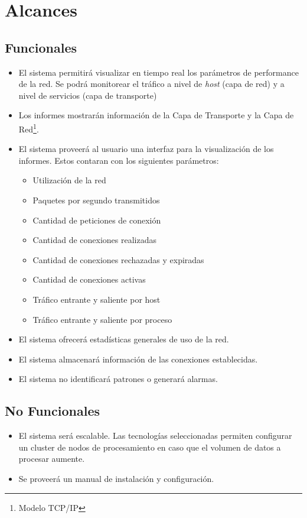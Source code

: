 \section*{Alcances}

\subsection*{Funcionales}
\begin{itemize}
	\item El sistema permitirá visualizar en tiempo real los parámetros de performance de la red. Se podrá monitorear el tráfico a nivel de \textit{host} (capa de red) y a nivel de servicios (capa de transporte)
	\item Los informes mostrarán información de la Capa de Transporte y la Capa de Red\footnote{Modelo TCP/IP}. \cite{rfc791}\cite{rfc793}\cite{rfc1180}
	\item El sistema proveerá al usuario una interfaz para la visualización de los informes. Estos contaran con los siguientes parámetros:
	\begin{itemize}
		\item Utilización de la red
		\item Paquetes por segundo transmitidos
		\item Cantidad de peticiones de conexión
		\item Cantidad de conexiones realizadas
		\item Cantidad de conexiones rechazadas y expiradas
		\item Cantidad de conexiones activas
		\item Tráfico entrante y saliente por host
		\item Tráfico entrante y saliente por proceso
	\end{itemize}
	\item El sistema ofrecerá estadísticas generales de uso de la red.
	\item El sistema almacenará información de las conexiones establecidas.
	\item El sistema no identificará patrones o generará alarmas.
\end{itemize}

\subsection*{No Funcionales}
\begin{itemize}
	\item El sistema será escalable. Las tecnologías seleccionadas permiten configurar un cluster de nodos de procesamiento en caso que el volumen de datos a procesar aumente.
	\item Se proveerá un manual de instalación y configuración.
\end{itemize}
 
